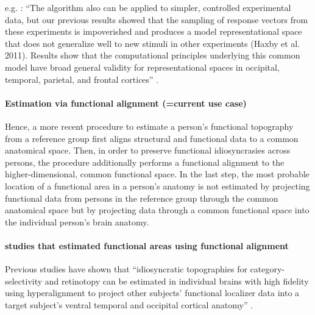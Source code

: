 
e.g. \citet{guntupalli2016model}: ``The algorithm also can be applied to
simpler, controlled experimental data, but our previous results showed that the
sampling of response vectors from these experiments is impoverished and produces
a model representational space that does not generalize well to new stimuli in
other experiments (Haxby et al.  2011). Results show that the computational
principles underlying this common model have broad general validity for
representational spaces in occipital, temporal, parietal, and frontal cortices''
\citep{guntupalli2016model}.


\paragraph{Estimation via functional alignment (=current use case)}


%
Hence, a more recent procedure to estimate a person's functional topography from
a reference group first aligns structural and functional data to a common
anatomical space. Then, in order to preserve functional idiosyncrasies across
persons, the procedure additionally performs a functional alignment to
the higher-dimensional, common functional space.
In the last step, the most probable location of a functional area in a person's
anatomy is not estimated by projecting functional data from persons in the
reference group through the common anatomical space but by projecting data
through a common functional space into the individual person's brain anatomy.


\paragraph{studies that estimated functional areas using functional alignment}



Previous studies \citep{jiahui2020predicting, guntupalli2016model,
haxby2011common} have shown that ``idiosyncratic topographies for
category-selectivity and retinotopy can be estimated in individual brains with
high fidelity using hyperalignment to project other subjects' functional
localizer data into a target subject's ventral temporal and occipital cortical
anatomy'' \citep{jiahui2020predicting}.

